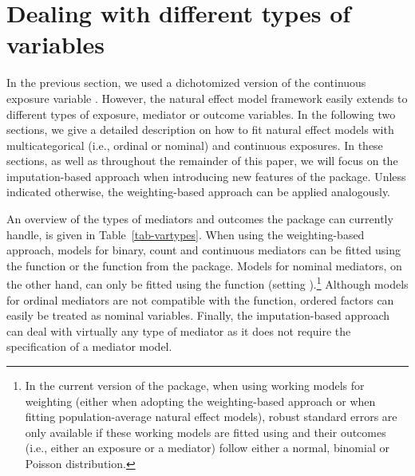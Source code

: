 \documentclass[nojss]{jss}
\begin{document}
\section{Dealing with different types of variables}\label{types}
In the previous section, we used a dichotomized version of the continuous exposure variable . However, the natural effect model framework easily extends to different types of exposure, mediator or outcome variables. In the following two sections, we give a detailed description on how to fit natural effect models with multicategorical (i.e., ordinal or nominal) and continuous exposures. In these sections, as well as throughout the remainder of this paper, we will focus on the imputation-based approach when introducing new features of the  package. Unless indicated otherwise, the weighting-based approach can be applied analogously.
\par An overview of the types of mediators and outcomes the  package can currently handle, is given in Table~\ref{tab-vartypes}. When using the weighting-based approach, models for binary, count and continuous mediators can be fitted using the  function or the  function from the  package. Models for nominal mediators, on the other hand, can only be fitted using the  function (setting ).\footnote{In the current version of the package, when using working models for weighting (either when adopting the weighting-based approach or when fitting population-average natural effect models), robust standard errors are only available if these working models are fitted using  and their outcomes (i.e., either an exposure or a mediator) follow either a normal, binomial or Poisson distribution.} Although models for ordinal mediators are not compatible with the  function, ordered factors can easily be treated as nominal variables. Finally, the imputation-based approach can deal with virtually any type of mediator as it does not require the specification of a mediator model.
\end{document}
